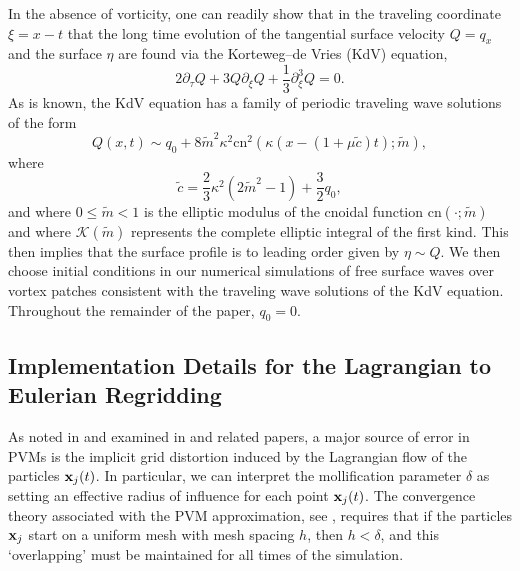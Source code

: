 \documentclass[a4paper,11pt]{article}
\newcommand{\p}{\partial}
\begin{document}
In the absence of vorticity, one can readily show that in the traveling coordinate $\xi = x-t$ that the long time evolution of the tangential surface velocity $Q = q_{x}$ and the surface $\eta$ are found via the Korteweg--de Vries (KdV) equation, 
\[
2\p_{\tau}Q + 3Q\p_{\xi}Q + \frac{1}{3} \p_{\xi}^{3}Q = 0.
\]
As is known, the KdV equation has a family of periodic traveling wave solutions of the form 
\begin{equation}
Q(x,t) \sim q_{0} + 8 \tilde{m}^{2}\kappa^{2}\mbox{cn}^{2}\left(\kappa \left( x- \left(1 + \mu \tilde{c}\right)t\right);\tilde{m}\right),
\label{kdvsolpot}
\end{equation}
where
\[
\tilde{c} = \frac{2}{3}\kappa^{2} (2\tilde{m}^{2}-1)+\frac{3}{2}q_{0},
\]
and where $0\leq \tilde{m}<1$ is the elliptic modulus of the cnoidal function $\mbox{cn}(\cdot;\tilde{m})$ and where $\mathcal{K}(\tilde{m})$ represents the complete elliptic integral of the first kind.  This then implies that the surface profile is to leading order given by $\eta \sim Q$.  We then choose initial conditions in our numerical simulations of free surface waves over vortex patches consistent with the traveling wave solutions of the KdV equation.  Throughout the remainder of the paper, $q_{0}=0$.  

\subsection*{Implementation Details for the Lagrangian to Eulerian Regridding}
As noted in \cite{beale} and examined in \cite{cottet} and related papers, a major source of error in PVMs is the implicit grid distortion induced by the Lagrangian flow of the particles ${\bf x}_{j}(t)$.  In particular, we can interpret the mollification parameter $\delta$ as setting an effective radius of influence for each point ${\bf x}_{j}(t)$.  The convergence theory associated with the PVM approximation, see \cite{cottet2}, requires that if the particles ${\bf x}_{j}$ start on a uniform mesh with mesh spacing $h$, then $h < \delta$, and this `overlapping' must be maintained for all times of the simulation.  
\end{document}
